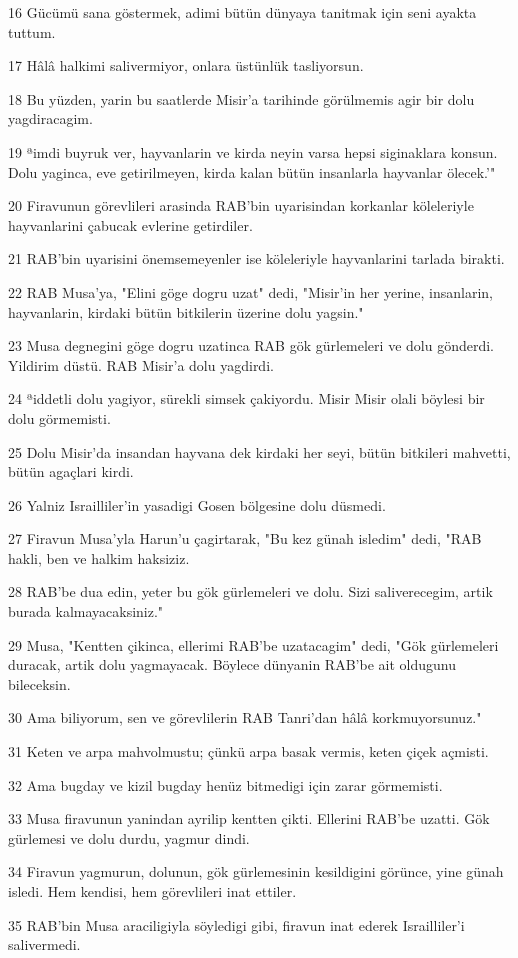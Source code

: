 \par 16 Gücümü sana göstermek, adimi bütün dünyaya tanitmak için seni ayakta tuttum.
\par 17 Hâlâ halkimi salivermiyor, onlara üstünlük tasliyorsun.
\par 18 Bu yüzden, yarin bu saatlerde Misir'a tarihinde görülmemis agir bir dolu yagdiracagim.
\par 19 ªimdi buyruk ver, hayvanlarin ve kirda neyin varsa hepsi siginaklara konsun. Dolu yaginca, eve getirilmeyen, kirda kalan bütün insanlarla hayvanlar ölecek.'"
\par 20 Firavunun görevlileri arasinda RAB'bin uyarisindan korkanlar köleleriyle hayvanlarini çabucak evlerine getirdiler.
\par 21 RAB'bin uyarisini önemsemeyenler ise köleleriyle hayvanlarini tarlada birakti.
\par 22 RAB Musa'ya, "Elini göge dogru uzat" dedi, "Misir'in her yerine, insanlarin, hayvanlarin, kirdaki bütün bitkilerin üzerine dolu yagsin."
\par 23 Musa degnegini göge dogru uzatinca RAB gök gürlemeleri ve dolu gönderdi. Yildirim düstü. RAB Misir'a dolu yagdirdi.
\par 24 ªiddetli dolu yagiyor, sürekli simsek çakiyordu. Misir Misir olali böylesi bir dolu görmemisti.
\par 25 Dolu Misir'da insandan hayvana dek kirdaki her seyi, bütün bitkileri mahvetti, bütün agaçlari kirdi.
\par 26 Yalniz Israilliler'in yasadigi Gosen bölgesine dolu düsmedi.
\par 27 Firavun Musa'yla Harun'u çagirtarak, "Bu kez günah isledim" dedi, "RAB hakli, ben ve halkim haksiziz.
\par 28 RAB'be dua edin, yeter bu gök gürlemeleri ve dolu. Sizi saliverecegim, artik burada kalmayacaksiniz."
\par 29 Musa, "Kentten çikinca, ellerimi RAB'be uzatacagim" dedi, "Gök gürlemeleri duracak, artik dolu yagmayacak. Böylece dünyanin RAB'be ait oldugunu bileceksin.
\par 30 Ama biliyorum, sen ve görevlilerin RAB Tanri'dan hâlâ korkmuyorsunuz."
\par 31 Keten ve arpa mahvolmustu; çünkü arpa basak vermis, keten çiçek açmisti.
\par 32 Ama bugday ve kizil bugday henüz bitmedigi için zarar görmemisti.
\par 33 Musa firavunun yanindan ayrilip kentten çikti. Ellerini RAB'be uzatti. Gök gürlemesi ve dolu durdu, yagmur dindi.
\par 34 Firavun yagmurun, dolunun, gök gürlemesinin kesildigini görünce, yine günah isledi. Hem kendisi, hem görevlileri inat ettiler.
\par 35 RAB'bin Musa araciligiyla söyledigi gibi, firavun inat ederek Israilliler'i salivermedi.

